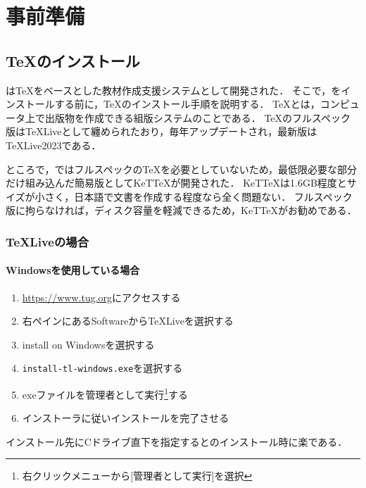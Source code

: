 
\addtocounter{page}{-1}

\chapter{事前準備}

\section{{\TeX}のインストール}

{\ketcindy}は{\TeX}をベースとした教材作成支援システムとして開発された．
そこで，{\ketcindy}をインストールする前に，{\TeX}のインストール手順を説明する．
{\TeX}とは，コンピュータ上で出版物を作成できる組版システムのことである．
{\TeX}のフルスペック版は{\TeX}Liveとして纏められたおり，毎年アップデートされ，最新版は{\TeX}Live2023である．

ところで，{\ketcindy}ではフルスペックの{\TeX}を必要としていないため，最低限必要な部分だけ組み込んだ簡易版としてKeT{\TeX}が開発された．
KeT{\TeX}は1.6GB程度とサイズが小さく，日本語で文書を作成する程度なら全く問題ない．
フルスペック版に拘らなければ，ディスク容量を軽減できるため，KeT{\TeX}がお勧めである．

\subsection{{\TeX}Liveの場合}

\subsubsection{Windowsを使用している場合}
\begin{enumerate}
    \item \url{https://www.tug.org}にアクセスする
    \item 右ペインにあるSoftwareからTeXLiveを選択する
    \item install on Windowsを選択する
    \item \verb|install-tl-windows.exe|を選択する
    \item exeファイルを管理者として実行\footnote{右クリックメニューから[管理者として実行]を選択}する
    \item インストーラに従いインストールを完了させる
\end{enumerate}
インストール先にCドライブ直下を指定すると{\ketcindy}のインストール時に楽である．

